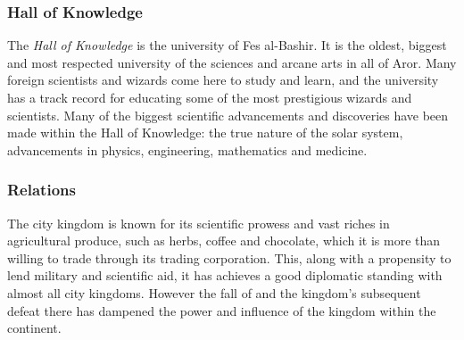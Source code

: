 \subsubsection*{Hall of Knowledge}
\label{sec:Hall of Knowledge}

The \emph{Hall of Knowledge} is the university of Fes al-Bashir. It is the
oldest, biggest and most respected university of the sciences and arcane arts
in all of Aror. Many foreign scientists and wizards come here to study and
learn, and the university has a track record for educating some of the most
prestigious wizards and scientists. Many of the biggest scientific
advancements and discoveries have been made within the Hall of Knowledge: the
true nature of the solar system, advancements in physics, engineering,
mathematics and medicine.

\subsubsection*{Relations}

The city kingdom is known for its scientific prowess and vast riches in
agricultural produce, such as herbs, coffee and chocolate, which it is more
than willing to trade through its trading corporation. This, along with a
propensity to lend military and scientific aid, it has achieves a good
diplomatic standing with almost all city kingdoms. However the fall of
 and the kingdom's subsequent defeat there has dampened
the power and influence of the kingdom within the continent.

